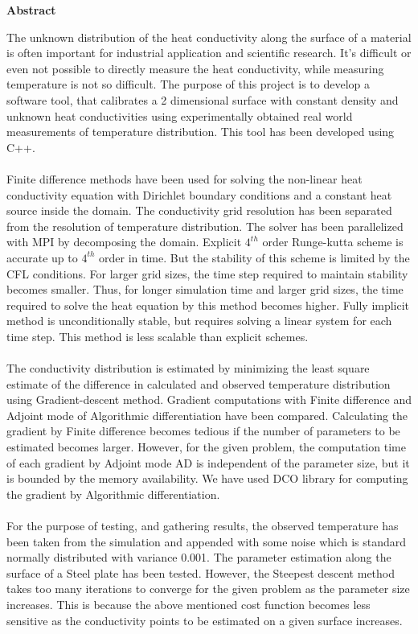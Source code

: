\documentclass[10pt,a4paper]{report}
\begin{document}
{
\thispagestyle{empty}
\normalsize
\begin{center}
{\large \textbf{Abstract}}
\end{center}
The unknown distribution of the heat conductivity along the surface of a material is often important for industrial application and scientific research. It’s difficult or even not possible to directly measure the heat conductivity, while measuring temperature is not so difficult. The purpose of this project is to develop a software tool, that calibrates a 2 dimensional surface with constant density and unknown heat conductivities using experimentally obtained real world measurements of temperature distribution. This tool has been developed using C++.\\
\\
Finite difference methods have been used for solving the non-linear heat conductivity equation with Dirichlet boundary conditions and a constant heat source inside the domain. The conductivity grid resolution has been separated from the resolution of temperature distribution. The solver has been parallelized with MPI by decomposing the domain. Explicit $4^{th}$ order Runge-kutta scheme is accurate up to $4^{th}$ order in time. But the stability of this scheme is limited by the CFL conditions. For larger grid sizes, the time step required to maintain stability becomes smaller. Thus, for longer simulation time and larger grid sizes, the time required to solve the heat equation by this method becomes higher. Fully implicit method is unconditionally stable, but requires solving a linear system for each time step. This method is less scalable than explicit schemes.\\
\\
The conductivity distribution is estimated by minimizing the least square estimate of the difference in calculated and observed temperature distribution using Gradient-descent method. Gradient computations with Finite difference and Adjoint mode of Algorithmic differentiation have been compared. Calculating the gradient by Finite difference becomes tedious if the number of parameters to be estimated becomes larger. However, for the given problem, the computation time of each gradient by Adjoint mode AD is independent of the parameter size, but it is bounded by the memory availability. We have used DCO library for computing the gradient by Algorithmic differentiation.\\
\\
For the purpose of testing, and gathering results, the observed temperature has been taken from the simulation and appended with some noise which is standard normally distributed with variance 0.001. The parameter estimation along the surface of a Steel plate has been tested. However, the Steepest descent method takes too many iterations to converge for the given problem as the parameter size increases. This is because the above mentioned cost function becomes less sensitive as the conductivity points to be estimated on a given surface increases.

}
\end{document}
